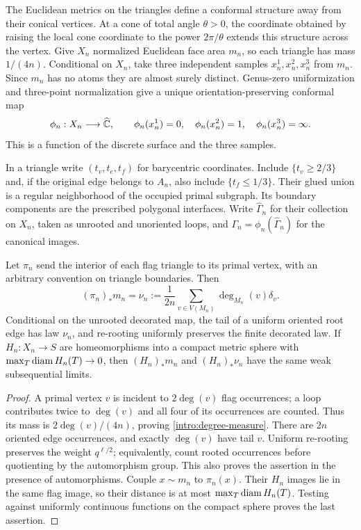The Euclidean metrics on the triangles define a conformal structure
away from their conical vertices. At a cone of total angle $\theta>0$,
the coordinate obtained by raising the local cone coordinate to the
power $2\pi/\theta$ extends this structure across the vertex. Give
$X_n$ normalized Euclidean face area $m_n$, so each triangle has
mass $1/(4n)$. Conditional on $X_n$, take three independent samples
$x_n^1,x_n^2,x_n^3$ from $m_n$. Since $m_n$ has no atoms they are
almost surely distinct. Genus-zero uniformization
\cite[Theorem~II.2.15]{SaintGervais2016Uniformization} and three-point
normalization give a unique orientation-preserving conformal map
\[
 \phi_n:X_n\longrightarrow\widehat{\mathbb C},
 \qquad
 \phi_n(x_n^1)=0,\quad\phi_n(x_n^2)=1,\quad
 \phi_n(x_n^3)=\infty.
\]
This is a function of the discrete surface and the three samples.

In a triangle write $(t_v,t_e,t_f)$ for barycentric coordinates.
Include $\{t_v\ge2/3\}$ and, if the original edge belongs to $A_n$,
also include $\{t_f\le1/3\}$. Their glued union is a regular
neighborhood of the occupied primal subgraph. Its boundary components
are the prescribed polygonal interfaces. Write $\widehat\Gamma_n$
for their collection on $X_n$, taken as unrooted and unoriented loops,
and $\Gamma_n=\phi_n(\widehat\Gamma_n)$ for the canonical images.

\begin{lemma}\label{intro:root-flag}
Let $\pi_n$ send the interior of each flag triangle to its primal
vertex, with an arbitrary convention on triangle boundaries. Then
\begin{equation}\label{intro:degree-measure}
 (\pi_n)_*m_n
 =\nu_n:=\frac1{2n}\sum_{v\in V(M_n)}\deg_{M_n}(v)\delta_v.
\end{equation}
Conditional on the unrooted decorated map, the tail of a uniform
oriented root edge has law $\nu_n$, and re-rooting uniformly preserves
the finite decorated law. If $H_n:X_n\to S$ are homeomorphisms into
a compact metric sphere with
$\max_T\operatorname{diam} H_n(T)\to0$, then $(H_n)_*m_n$ and
$(H_n)_*\nu_n$ have the same weak subsequential limits.
\end{lemma}

\begin{proof}
A primal vertex $v$ is incident to $2\deg(v)$ flag occurrences;
a loop contributes twice to $\deg(v)$ and all four of its occurrences
are counted. Thus its mass is $2\deg(v)/(4n)$, proving
\eqref{intro:degree-measure}. There are $2n$ oriented edge
occurrences, and exactly $\deg(v)$ have tail $v$. Uniform re-rooting
preserves the weight $q^{\ell/2}$; equivalently, count rooted
occurrences before quotienting by the automorphism group. This also
proves the assertion in the presence of automorphisms.
Couple $x\sim m_n$ to $\pi_n(x)$. Their $H_n$ images lie in the
same flag image, so their distance is at most
$\max_T\operatorname{diam} H_n(T)$. Testing against uniformly continuous
functions on the compact sphere proves the last assertion.
\end{proof}

